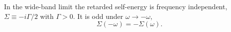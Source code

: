 \documentclass{article}
\begin{document}
In the wide-band limit the retarded self-energy is frequency independent, $\Sigma \equiv -i\Gamma/2$ with $\Gamma>0$.
It is odd under $\omega\to-\omega$,
\begin{equation}
\Sigma(-\omega) = -\Sigma(\omega) .
\label{eq:odd}
\end{equation}
\end{document}
